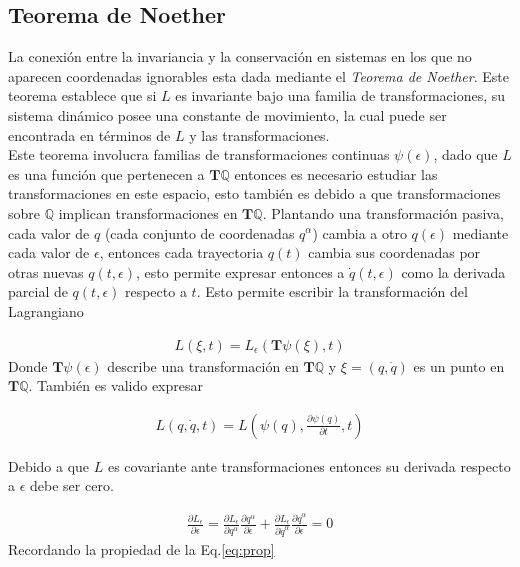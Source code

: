 \subsection[short]{Teorema de Noether}

La conexión entre la invariancia y la conservación en sistemas en los que no aparecen coordenadas ignorables esta dada mediante el \textit{Teorema de Noether}. Este teorema establece que si $L$ es invariante bajo una familia de transformaciones, su sistema dinámico posee una constante de movimiento, la cual puede ser encontrada en términos de $L$ y las transformaciones.
\vspace{2cm}
\\
Este teorema involucra familias de transformaciones continuas $\psi(\epsilon)$, dado que $L$ es una función que pertenecen a $\mathbf{T}\mathbb{Q}$ entonces es necesario estudiar las transformaciones en este espacio, esto también es debido a que transformaciones sobre $\mathbb{Q}$ implican transformaciones en $\mathbf{T}\mathbb{Q}$. Plantando una transformación pasiva, cada valor de $q$ (cada conjunto de coordenadas $q^{\alpha}$) cambia a otro $q(\epsilon)$ mediante cada valor de $\epsilon$, entonces cada trayectoria $q(t)$ cambia sus coordenadas por otras nuevas $q(t,\epsilon)$, esto permite expresar entonces a $\dot{q}(t,\epsilon)$ como  la derivada parcial de $q(t,\epsilon)$ respecto a $t$. Esto permite escribir la transformación del Lagrangiano

\begin{gather*}
    L(\xi,t) = L_\epsilon(\mathbf{T}\psi(\xi),t) 
\end{gather*}
Donde $\mathbf{T}\psi(\epsilon)$ describe una transformación en $\mathbf{T}\mathbb{Q}$ y $\xi = (q,\dot{q})$ es un punto en $\mathbf{T}\mathbb{Q}$. También es valido expresar 

\begin{gather*}
    L(q,\dot{q},t) = L\left(\psi(q),\frac{\partial \psi(q)}{\partial t},t\right)
\end{gather*}

Debido a que $L$ es covariante ante transformaciones entonces su derivada respecto a $\epsilon$ debe ser cero.

\begin{gather*}
    \frac{\partial L_\epsilon}{\partial \epsilon} = \frac{\partial L_\epsilon}{\partial q^{\alpha}}\frac{\partial q^{\alpha}}{\partial \epsilon} + \frac{\partial L_\epsilon}{\partial \dot{q}^{\alpha}}\frac{\partial \dot{q}^{\alpha}}{\partial \epsilon}  = 0
\end{gather*}
Recordando la propiedad de la Eq.\ref*{eq:prop}

